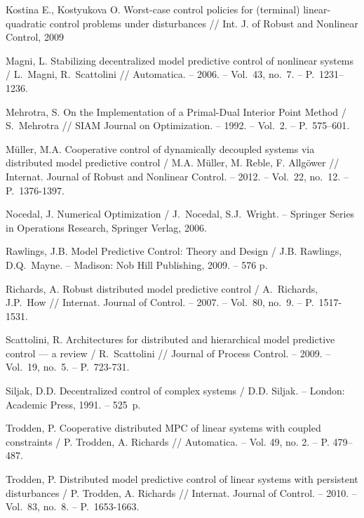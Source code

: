 \begin{biblio}
Kostina E., Kostyukova O. Worst-case control policies for (terminal) linear-quadratic control problems under disturbances // Int. J. of Robust and Nonlinear Control, 2009

Magni, L. Stabilizing decentralized model predictive control of nonlinear systems / L.~Magni,
R.~Scattolini  // Automatica. -- 2006. -- Vol.~43, no.~7. -- P.~1231–1236.

Mehrotra, S. On the Implementation of a Primal-Dual Interior Point Method / S.~Mehrotra // SIAM
Journal on Optimization. -- 1992. -- Vol.~2. -- P.~575–601.

M{\"u}ller, M.A. Cooperative control of dynamically decoupled systems via distributed  model
predictive control / M.A. M{\"u}ller,  M. Reble, F. Allg{\"o}wer // Internat. Journal of Robust and
Nonlinear Control. -- 2012. -- Vol.~22, no.~12.  -- P.~1376-1397.

Nocedal, J. Numerical Optimization / J.~Nocedal,  S.J.~Wright. -- Springer Series in Operations
Research, Springer Verlag, 2006.

Rawlings, J.B. Model Predictive Control: Theory and Design / J.B. Rawlings, D.Q.~Mayne. -- Madison:
Nob Hill Publishing, 2009. -- 576 p.

Richards, A. Robust distributed model predictive control /  A.~Richards,  J.P.~How  // Internat.
Journal of Control. -- 2007. -- Vol.~80, no.~9. -- P.~1517-1531.

Scattolini, R.  Architectures for distributed and hierarchical model predictive   control
--- a review / R.~Scattolini // Journal of Process Control.  -- 2009. -- Vol.~19, no.~5. -- P.~723-731.

Siljak, D.D.  Decentralized control of complex systems /  D.D. Siljak. --  London: Academic Press,
1991. -- 525~p.

Trodden, P. Cooperative distributed MPC of linear systems with coupled constraints / P. Trodden, A.
Richards  // Automatica. -- Vol. 49, no. 2. -- P. 479–487.

Trodden, P. Distributed model predictive control of linear systems with persistent disturbances /
P. Trodden, A. Richards  // Internat. Journal of Control. -- 2010. -- Vol.~83, no.~8. --
P.~1653-1663.

\end{biblio} 